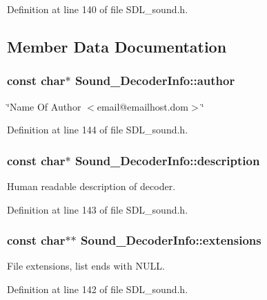 Definition at line 140 of file S\-D\-L\-\_\-sound.\-h.



\subsection{Member Data Documentation}
\hypertarget{structSound__DecoderInfo_a1d3c5d5d46b0f5e5026944002e1d6e36}{
\subsubsection[{author}]{\setlength{\rightskip}{0pt plus 5cm}const char$\ast$ {\bf Sound\-\_\-\-Decoder\-Info\-::author}}}\label{structSound__DecoderInfo_a1d3c5d5d46b0f5e5026944002e1d6e36}
\char`\"{}\-Name Of Author $<$email@emailhost.\-dom$>$\char`\"{} 

Definition at line 144 of file S\-D\-L\-\_\-sound.\-h.

\hypertarget{structSound__DecoderInfo_ac1241b30e4121aedd4286351b27f93d5}{
\subsubsection[{description}]{\setlength{\rightskip}{0pt plus 5cm}const char$\ast$ {\bf Sound\-\_\-\-Decoder\-Info\-::description}}}\label{structSound__DecoderInfo_ac1241b30e4121aedd4286351b27f93d5}
Human readable description of decoder. 

Definition at line 143 of file S\-D\-L\-\_\-sound.\-h.

\hypertarget{structSound__DecoderInfo_a9f11db9acb555302fd84509198683e2a}{
\subsubsection[{extensions}]{\setlength{\rightskip}{0pt plus 5cm}const char$\ast$$\ast$ {\bf Sound\-\_\-\-Decoder\-Info\-::extensions}}}\label{structSound__DecoderInfo_a9f11db9acb555302fd84509198683e2a}
File extensions, list ends with N\-U\-L\-L. 

Definition at line 142 of file S\-D\-L\-\_\-sound.\-h.

